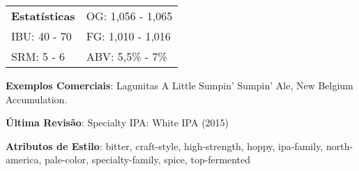 \begin{tabular}{@{}p{35mm}p{35mm}@{}}
  \textbf{Estatísticas} & OG: 1,056 - 1,065 \\
  IBU: 40 - 70  & FG: 1,010 - 1,016 \\
  SRM: 5 - 6  & ABV: 5,5\% - 7\%
\end{tabular}

\textbf{Exemplos Comerciais}: Lagunitas A Little Sumpin' Sumpin' Ale, New Belgium Accumulation.

\textbf{Última Revisão}: Specialty IPA: White IPA (2015)

\textbf{Atributos de Estilo}: bitter, craft-style, high-strength, hoppy, ipa-family, north-america, pale-color, specialty-family, spice, top-fermented
